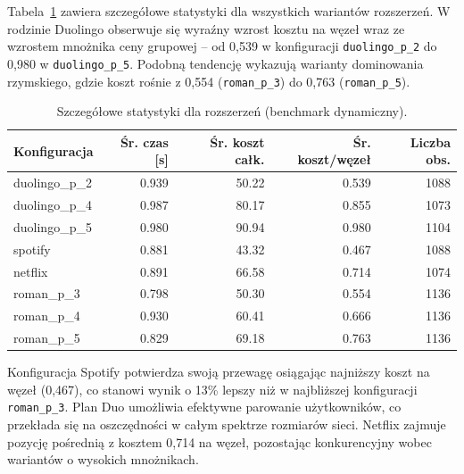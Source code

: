 Tabela~\ref{tab:ext-dynamic-detailed} zawiera szczegółowe statystyki dla wszystkich wariantów rozszerzeń. W rodzinie Duolingo obserwuje się wyraźny wzrost kosztu na węzeł wraz ze wzrostem mnożnika ceny grupowej -- od 0,539 w konfiguracji \texttt{duolingo\_p\_2} do 0,980 w \texttt{duolingo\_p\_5}. Podobną tendencję wykazują warianty dominowania rzymskiego, gdzie koszt rośnie z 0,554 (\texttt{roman\_p\_3}) do 0,763 (\texttt{roman\_p\_5}).

\begin{table}[H]
  \centering
  \caption{Szczegółowe statystyki dla rozszerzeń (benchmark dynamiczny).}
  \label{tab:ext-dynamic-detailed}
  \begin{tabular}{lrrrr}
    \toprule
    \textbf{Konfiguracja} & \textbf{Śr. czas [s]} & \textbf{Śr. koszt całk.} & \textbf{Śr. koszt/węzeł} & \textbf{Liczba obs.} \\
    \midrule
    duolingo\_p\_2        & 0.939                 & 50.22                    & 0.539                    & 1088                 \\
    duolingo\_p\_4        & 0.987                 & 80.17                    & 0.855                    & 1073                 \\
    duolingo\_p\_5        & 0.980                 & 90.94                    & 0.980                    & 1104                 \\
    spotify               & 0.881                 & 43.32                    & 0.467                    & 1088                 \\
    netflix               & 0.891                 & 66.58                    & 0.714                    & 1074                 \\
    roman\_p\_3           & 0.798                 & 50.30                    & 0.554                    & 1136                 \\
    roman\_p\_4           & 0.930                 & 60.41                    & 0.666                    & 1136                 \\
    roman\_p\_5           & 0.829                 & 69.18                    & 0.763                    & 1136                 \\
    \bottomrule
  \end{tabular}
\end{table}

Konfiguracja Spotify potwierdza swoją przewagę osiągając najniższy koszt na węzeł (0,467), co stanowi wynik o 13\% lepszy niż w najbliższej konfiguracji \texttt{roman\_p\_3}. Plan Duo umożliwia efektywne parowanie użytkowników, co przekłada się na oszczędności w całym spektrze rozmiarów sieci. Netflix zajmuje pozycję pośrednią z kosztem 0,714 na węzeł, pozostając konkurencyjny wobec wariantów o wysokich mnożnikach.


